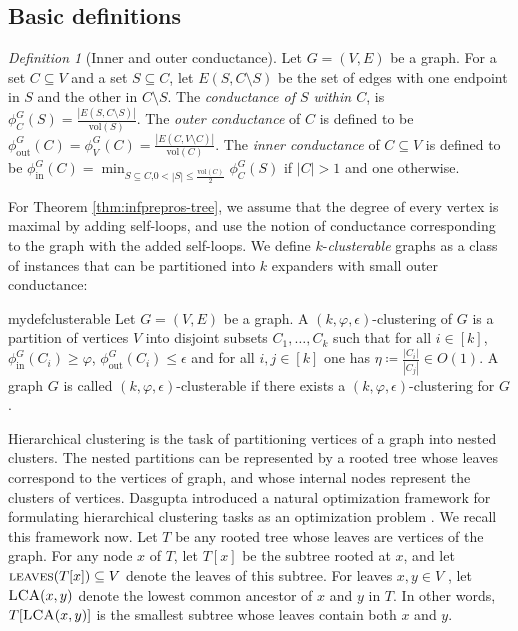 \documentclass[letterpaper,11pt]{article}
\newcommand{\lca}{\textsc{LCA}}
\newcommand{\lv}{\textsc{leaves}}
\theoremstyle{plain}
\theoremstyle{definition}
\theoremstyle{remark}
\newtheorem{mydef}{Definition}
\newcommand{\vol}{\text{vol}}
\begin{document}
\vspace{-5pt}

\subsection{Basic definitions}


\begin{mydef}[Inner and outer conductance] \label{def:inner-outer-conductance}
Let $G = (V, E) $ be a graph. For a set $C\subseteq V$ and a set $S\subseteq C$, let $E(S,C\setminus S)$ be the set of edges with one endpoint in $S$ and the other in $C\setminus S$. The \textit{conductance of $S$ within $C$}, is $ \phi^G_C(S)=\frac{|E(S, C\setminus S)|}{\vol(S)} $. The \textit{outer conductance} of $C$ is defined to be 
$\phi^G_{\text{out}}(C)=\phi_V^G(C)=\frac{|E(C,V\setminus C)|}{\vol(C)}\text{.}$ The \textit{inner conductance} of $C\subseteq V$ is defined to be  $\phi_{\text{in}}^G(C)=\min_{S\subseteq C\text{,} 0<|S|\leq \frac{\vol(C)}{2}}\phi^G_C(S)$ if $|C|>1$ and one otherwise. 
\end{mydef}
For Theorem {\ref{thm:infprepros-tree}}, we assume that the degree of every vertex is maximal by adding self-loops, and use the notion of conductance corresponding to the graph with the added self-loops. We define $k$-\textit{clusterable} graphs as a class of instances that can be partitioned into $k$ expanders with small outer conductance:

\begin{restatable}{mydef}{clusterable}\label{def:clusterable}
Let $G=(V,E)$ be a graph. A $(k,\varphi,\epsilon)$-clustering of $G$ is a partition of vertices $V$ into disjoint subsets $C_1, \ldots, C_k$ such that for all $i\in [k]$, $\phi_{\text{in}}^G(C_i)\geq\varphi$, $\phi_{\text{out}}^G(C_i)\leq\epsilon$ and for all $i,j \in [k]$ one has $\eta \coloneqq \frac{|C_i|}{|C_j|} \in O(1).$ A graph $G$ is called $(k,\varphi,\epsilon)$-clusterable if there exists a $(k,\varphi,\epsilon)$-clustering for $G$.
\end{restatable}



 Hierarchical clustering is the task of partitioning vertices of a graph into nested clusters. 
The nested partitions can be represented by a rooted tree whose leaves correspond to the vertices 
of graph, and whose internal nodes represent the clusters of vertices. Dasgupta 
introduced a natural optimization framework for formulating hierarchical clustering tasks as an 
optimization problem \cite{dasgupta2016cost}. We recall this framework now. Let $T$ be any rooted tree whose leaves are vertices of the graph. For any node $x$ of $T$, let $T[x]$ be the subtree rooted at $x$, and let $\lv(T[x]) \subseteq V$ denote the leaves of this subtree. For leaves $x,y \in V$ , let $\lca(x,y)$ denote the lowest common ancestor of $x$ and $y$ in $T$. In other words, $T[\lca(x,y)]$ is the smallest subtree whose leaves contain both $x$ and $y$. 
\end{document}
